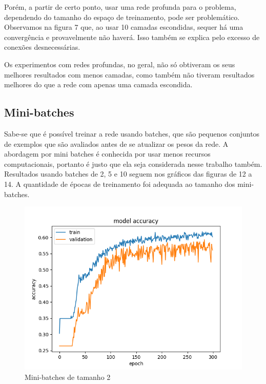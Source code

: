 \documentclass[11pt]{article}
\begin{document}
Porém, a partir de certo ponto, usar uma rede profunda para o problema, dependendo do tamanho do espaço de treinamento, pode ser problemático. Observamos na figura 7 que, ao usar 10 camadas escondidas, sequer há uma convergência e provavelmente não haverá. Isso também se explica pelo excesso de conexões desnecessárias.

Os experimentos com redes profundas, no geral, não só obtiveram os seus melhores resultados com menos camadas, como também não tiveram resultados melhores do que a rede com apenas uma camada escondida.

\subsection*{Mini-batches}

Sabe-se que é possível treinar a rede usando batches, que são pequenos conjuntos de exemplos que são avaliados antes de se atualizar os pesos da rede. A abordagem por mini batches é conhecida por usar menos recursos computacionais, portanto é justo que ela seja considerada nesse trabalho também. Resultados usando batches de 2, 5 e 10 seguem nos gráficos das figuras de 12 a 14. A quantidade de épocas de treinamento foi adequada ao tamanho dos mini-batches.

\begin{figure}
	\includegraphics[width=\linewidth]{exp/Figure_8.png}
	\caption{Mini-batches de tamanho 2}
	\label{fig:f4}
\end{figure}
\end{document}
